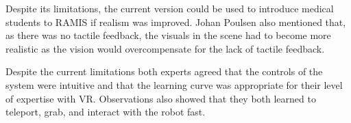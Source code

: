 Despite its limitations, the current version could be used to introduce medical students to RAMIS if realism was improved. Johan Poulsen also mentioned that, as there was no tactile feedback, the visuals in the scene had to become more realistic as the vision would overcompensate for the lack of tactile feedback. 

Despite the current limitations both experts agreed that the controls of the system were intuitive and that the learning curve was appropriate for their level of expertise with VR. Observations also showed that they both learned to teleport, grab, and interact with the robot fast. 


